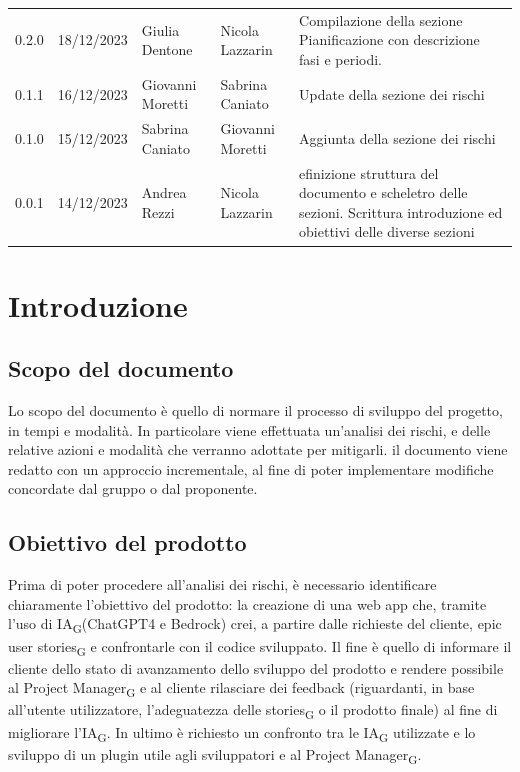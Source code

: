 \documentclass{article}
\begin{document}
\begin{center}
\begin{tabular}{P{5em} P{6em} P{8em} P{8em} P{10em}} 
     0.2.0 & 18/12/2023 & Giulia Dentone & Nicola Lazzarin & Compilazione della sezione Pianificazione con descrizione fasi e periodi.\\
     0.1.1 & 16/12/2023 & Giovanni Moretti & Sabrina Caniato & Update della sezione dei rischi\\

    0.1.0 & 15/12/2023 & Sabrina Caniato & Giovanni Moretti & Aggiunta della sezione dei rischi\\
     0.0.1 & 14/12/2023 & Andrea Rezzi & Nicola Lazzarin & efinizione struttura del documento e scheletro delle sezioni. Scrittura introduzione ed obiettivi delle diverse sezioni\\ 
\end{tabular}
\end{center}
\newpage
\tableofcontents
\newpage
\section{Introduzione}
\subsection{Scopo del documento}
Lo scopo del documento è quello di normare il processo di sviluppo del progetto, in tempi e modalità. In particolare viene effettuata un'analisi dei rischi, e delle relative azioni e modalità che verranno adottate per mitigarli. il documento viene redatto con un approccio incrementale, al fine di poter implementare modifiche concordate dal gruppo o dal proponente.

\subsection{Obiettivo del prodotto}
Prima di poter procedere all'analisi dei rischi, è necessario identificare chiaramente l'obiettivo del prodotto: la creazione di una web app che, tramite l’uso di IA\textsubscript{G}(ChatGPT4 e Bedrock) crei, a partire dalle richieste del cliente, epic user stories\textsubscript{G} e confrontarle con il codice sviluppato. Il fine è quello di informare il cliente dello stato di avanzamento dello sviluppo del prodotto e rendere possibile al Project Manager\textsubscript{G} e al cliente rilasciare dei
feedback (riguardanti, in base all'utente utilizzatore, l'adeguatezza delle stories\textsubscript{G} o il prodotto finale) al fine di migliorare l’IA\textsubscript{G}. In ultimo è richiesto un confronto tra le IA\textsubscript{G} utilizzate e lo sviluppo di un plugin utile agli sviluppatori e al Project Manager\textsubscript{G}.
\end{document}
